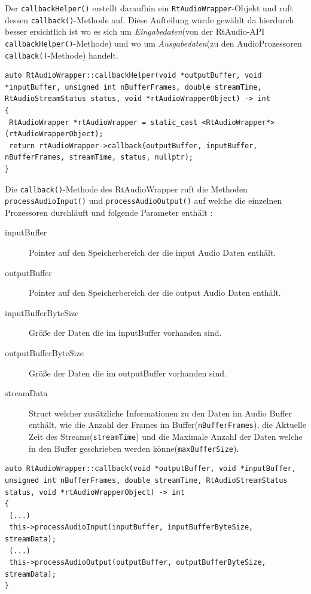 Der \texttt{callbackHelper()} erstellt daraufhin ein \texttt{RtAudioWrapper}-Objekt und ruft dessen \texttt{callback()}-Methode auf. Diese Aufteilung wurde gewählt da hierdurch besser ersichtlich ist wo es sich um \textit{Eingabedaten}(von der RtAudio-API \texttt{callbackHelper()}-Methode) und wo um \textit{Ausgabedaten}(zu den AudioProzessoren \texttt{callback()}-Methode) handelt.

\begin{lstlisting}[caption={\texttt{callbackHelper()}-Methode im RtAudioWrapper},label={Code:RtAudio CallbackHelper}]
auto RtAudioWrapper::callbackHelper(void *outputBuffer, void *inputBuffer, unsigned int nBufferFrames, double streamTime, RtAudioStreamStatus status, void *rtAudioWrapperObject) -> int
{
 RtAudioWrapper *rtAudioWrapper = static_cast <RtAudioWrapper*> (rtAudioWrapperObject);
 return rtAudioWrapper->callback(outputBuffer, inputBuffer, nBufferFrames, streamTime, status, nullptr);
}
\end{lstlisting}

Die \texttt{callback()}-Methode des RtAudioWrapper ruft die Methoden \texttt{processAudio\-Input()} und \texttt{processAudioOutput()} auf welche die einzelnen Prozessoren durchläuft und folgende Parameter enthält :
\begin{description}
\item[inputBuffer] Pointer auf den Speicherbereich der die input Audio Daten enthält.
\item[outputBuffer] Pointer auf den Speicherbereich der die output Audio Daten enthält.
\item[inputBufferByteSize] Größe der Daten die im inputBuffer vorhanden sind.
\item[outputBufferByteSize] Größe der Daten die im outputBuffer vorhanden sind.
\item[streamData] Struct welcher zusätzliche Informationen zu den Daten im Audio Buffer enthält, wie die Anzahl der Frames im Buffer(\texttt{nBufferFrames}), die Aktuelle Zeit des Streams(\texttt{streamTime}) und die Maximale Anzahl der Daten welche in den Buffer geschrieben werden könne(\texttt{maxBufferSize}).
\end{description}

\begin{lstlisting}[caption={callback Methode im RtAudioWrapper},label={Code:RtAudio Callback}]
auto RtAudioWrapper::callback(void *outputBuffer, void *inputBuffer, unsigned int nBufferFrames, double streamTime, RtAudioStreamStatus status, void *rtAudioWrapperObject) -> int
{
 (...)
 this->processAudioInput(inputBuffer, inputBufferByteSize, streamData);
 (...)
 this->processAudioOutput(outputBuffer, outputBufferByteSize, streamData);
}
\end{lstlisting}

